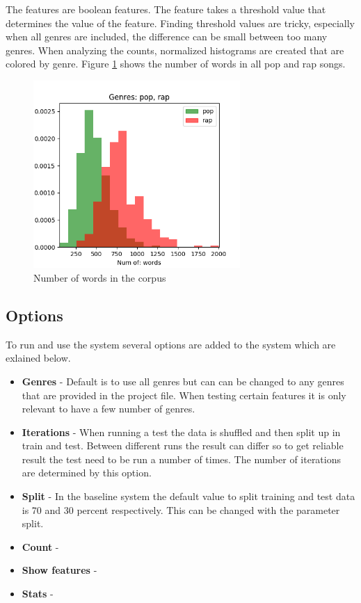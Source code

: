 \documentclass[a4paper, 12pt]{article}
\begin{document}
The features are boolean features.
The feature takes a threshold value that determines the value of the feature.
Finding threshold values are tricky, especially when all genres are included, the difference can be small between too many genres.
When analyzing the counts, normalized histograms are created that are colored by genre.
Figure \ref{fig:words} shows the number of words in all pop and rap songs.

\begin{figure}[H]
    \centering
    \includegraphics[width=0.7\textwidth]{res/words-pop_rap.png}
    \caption{Number of words in the corpus}
    \label{fig:words}
  \end{figure}

\subsection{Options}
To run and use the system several options are added to the system which are exlained below.

\begin{itemize}
    \item {\textbf{Genres} - Default is to use all genres but can can be changed to any genres that are provided in the project file.
    When testing certain features it is only relevant to have a few number of genres.}
    \item {\textbf{Iterations} - When running a test the data is shuffled and then split up in train and test.
    Between different runs the result can differ so to get reliable result the test need to be run a number of times.
    The number of iterations are determined by this option.}
    \item {\textbf{Split} - In the baseline system the default value to split training and test data is 70 and 30 percent respectively.
    This can be changed with the parameter split.}
    \item {\textbf{Count} - }
    \item {\textbf{Show features} - }
    \item {\textbf{Stats} - }
\end{itemize}
\end{document}

